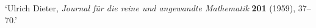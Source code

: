 `Ulrich Dieter, {\sl Journal f\"ur die
reine und angewandte Mathematik} {\bf201} (1959), 37--70.'

\bye

